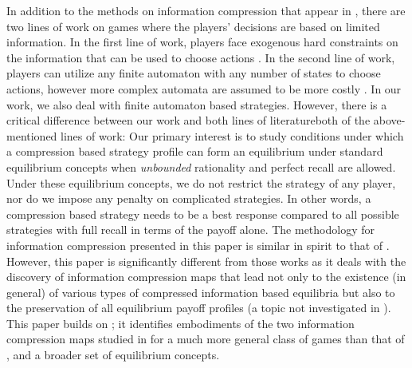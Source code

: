 \documentclass[pdflatex,sn-basic]{sn-jnl}
\theoremstyle{thmstyleone}%
\theoremstyle{thmstyletwo}%
\theoremstyle{thmstylethree}%
\begin{document}
{In addition to the methods on information compression that appear in \cite{maskin2001markov,nayyar2013common,ouyang2016dynamic,tang2022dynamic}, there are two lines of work on games where the players' decisions are based on limited information.} In the first line of work, players face exogenous hard constraints on the information that can be used to choose actions \citep{piccione1997interpretation,battigalli1997dynamic,GROVE199751,HALPERN199766,AUMANN1997102}.
In the second line of work, players can utilize any finite automaton with any number of states to choose actions, however more complex automata are assumed to be more costly \citep{abreu1988structure,banks1990repeated}. In our work, we also deal with finite automaton based strategies. However, there is a critical difference between our work and {both lines of literature}{both of the above-mentioned lines of work}: Our primary interest is to study conditions under which a compression based strategy profile can form an equilibrium under standard equilibrium concepts {when \emph{unbounded} rationality and perfect recall are allowed}. Under these equilibrium concepts, we do not restrict the strategy of any player, nor do we impose any penalty on complicated strategies. In other words, a compression based strategy needs to be a best response compared to all possible strategies with full recall in terms of the payoff alone.
The methodology for information compression presented in this paper is similar in spirit to that of \cite{maskin2001markov,nayyar2013common,ouyang2016dynamic,vasal2019spbe,ouyang2024approach}. {However}, this paper is significantly different from those works as it deals with the discovery of information compression maps that lead not only to the existence {(in general)} of various types of compressed information based equilibria but also to the preservation of all equilibrium payoff profiles (a topic not investigated in \cite{maskin2001markov,nayyar2013common,ouyang2016dynamic,vasal2019spbe,ouyang2024approach}).
This paper builds on \cite{tang2022dynamic}; it identifies embodiments of the two information compression maps studied in \cite{tang2022dynamic} for a much more general class of games than that of \cite{tang2022dynamic}, and a broader set of equilibrium concepts.
\end{document}
